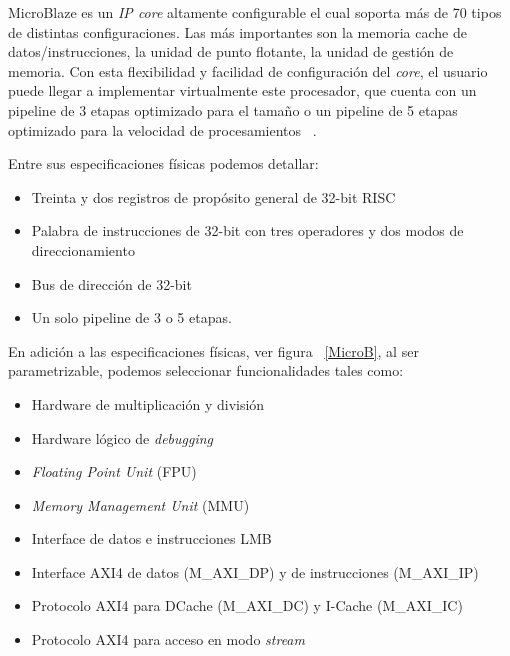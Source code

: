 \documentclass[a4paper,openright,12pt]{report}
\begin{document}
MicroBlaze es un \textit{IP core} altamente configurable  el cual soporta más de 70 tipos de distintas configuraciones. Las más importantes son la memoria cache de datos/instrucciones, la unidad de punto flotante, la unidad de gestión de memoria. Con esta flexibilidad y facilidad de configuración del \textit{core}, el usuario puede llegar a implementar virtualmente este procesador, que cuenta con un pipeline de 3 etapas optimizado para el tamaño o un pipeline de 5 etapas optimizado para la velocidad de procesamientos ~\cite{MICRO}.

Entre sus especificaciones físicas podemos detallar:

\begin{itemize}
\item Treinta y dos registros de propósito general de 32-bit RISC
\item  Palabra de instrucciones de 32-bit con tres operadores y dos modos de direccionamiento
\item  Bus de dirección de 32-bit
\item Un solo pipeline de 3 o 5 etapas.
\end{itemize}

En adición a las especificaciones físicas, ver figura ~\ref{MicroB}, al ser parametrizable, podemos seleccionar funcionalidades tales como:

\begin{itemize}
\item Hardware de multiplicación y división
\item Hardware lógico de \textit{debugging}
\item \textit{Floating Point Unit} (FPU)
\item \textit{Memory Management Unit} (MMU)
\item Interface de datos e instrucciones LMB
\item Interface AXI4 de datos (M\_AXI\_DP) y de instrucciones (M\_AXI\_IP) 
\item Protocolo AXI4 para D\-Cache (M\_AXI\_DC) y I-Cache (M\_AXI\_IC)
\item Protocolo AXI4 para acceso en modo \textit{stream}

\end{itemize}
\end{document}

